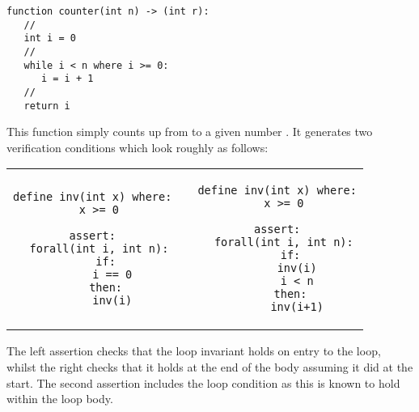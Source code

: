 \begin{tcolorbox}\begin{lstlisting}[language=Whiley]
function counter(int n) -> (int r):
   //
   int i = 0
   //
   while i < n where i >= 0:
      i = i + 1
   //
   return i
\end{lstlisting}\end{tcolorbox}

This function simply counts up from  to a given number
.  It generates two verification conditions which look
roughly as follows:

\begin{center}
\begin{tabular}{c c c}
\begin{minipage}[t]{0.45\textwidth}
\begin{tcolorbox}\begin{lstlisting}[language=WyAL]
define inv(int x) where:
  x >= 0

assert:
  forall(int i, int n):
    if:
      i == 0
    then:
      inv(i)

\end{lstlisting}\end{tcolorbox}
\end{minipage}&&
\begin{minipage}[t]{0.45\textwidth}
\begin{tcolorbox}\begin{lstlisting}[language=WyAL]
define inv(int x) where:
  x >= 0

assert:
  forall(int i, int n):
    if:
      inv(i)
      i < n
    then:
      inv(i+1)
\end{lstlisting}\end{tcolorbox}
\end{minipage}\\
\end{tabular}
\end{center}

The left assertion checks that the loop invariant holds on entry to
the loop, whilst the right checks that it holds at the end of the body
assuming it did at the start.  The second assertion includes the loop
condition as this is known to hold within the loop body.



